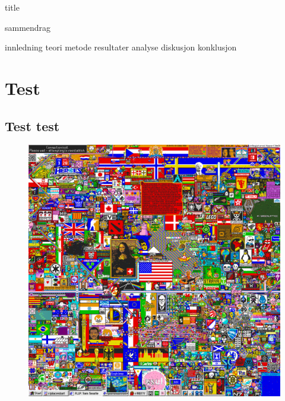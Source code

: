 



{title}
\newpage

\cleardoublepage
\tableofcontents
\newpage

{sammendrag}


{innledning}
{teori}
{metode}
{resultater}
{analyse}
{diskusjon}
{konklusjon}

\section{Test}
\subsection{Test test}

\begin{figure}[h]\label{r/place}
    \centering
    \includegraphics[width=.6\textwidth]{img/r_place.png}
\end{figure}

\newpage

\printbibliography[heading=bibintoc]
\listoffigures

